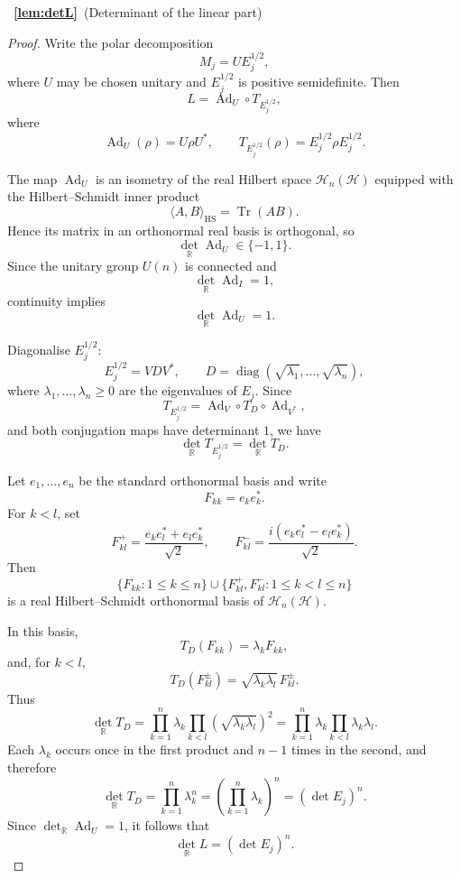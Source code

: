 \documentclass[11pt]{article}
\newcommand{\Tr}{\operatorname{Tr}}
\newcommand{\Herm}{\mathcal{H}_{n}}
\DeclareMathOperator{\diag}{diag}
\newcommand{\Ad}{\operatorname{Ad}}
\begin{document}
~{\bf \ref{lem:detL}}~(Determinant of the linear part)
\begin{proof}
Write the polar decomposition
\[
M_j=U E_j^{1/2},
\]
where \(U\) may be chosen unitary and \(E_j^{1/2}\) is positive
semidefinite. Then
\[
L=\Ad_U\circ T_{E_j^{1/2}},
\]
where
\[
\Ad_U(\rho)=U\rho U^*,
\qquad
T_{E_j^{1/2}}(\rho)
=
E_j^{1/2}\rho E_j^{1/2}.
\]

The map \(\Ad_U\) is an isometry of the real Hilbert space
\(\Herm(\mathcal H)\) equipped with the Hilbert--Schmidt inner product
\[
\langle A,B\rangle_{\mathrm{HS}}
=
\Tr(AB).
\]
Hence its matrix in an orthonormal real basis is orthogonal, so
\[
\det_{\mathbb R}\Ad_U\in\{-1,1\}.
\]
Since the unitary group \(U(n)\) is connected and
\[
\det_{\mathbb R}\Ad_I=1,
\]
continuity implies
\[
\det_{\mathbb R}\Ad_U=1.
\]

Diagonalise \(E_j^{1/2}\):
\[
E_j^{1/2}
=
V D V^*,
\qquad
D=\diag(\sqrt{\lambda_1},\ldots,\sqrt{\lambda_n}),
\]
where \(\lambda_1,\ldots,\lambda_n\geq0\) are the eigenvalues of
\(E_j\). Since
\[
T_{E_j^{1/2}}
=
\Ad_V\circ T_D\circ\Ad_{V^*},
\]
and both conjugation maps have determinant \(1\), we have
\[
\det_{\mathbb R}T_{E_j^{1/2}}
=
\det_{\mathbb R}T_D.
\]

Let \(e_1,\ldots,e_n\) be the standard orthonormal basis and write
\[
F_{kk}=e_ke_k^*.
\]
For \(k<l\), set
\[
F_{kl}^{+}
=
\frac{e_ke_l^*+e_le_k^*}{\sqrt2},
\qquad
F_{kl}^{-}
=
\frac{i(e_ke_l^*-e_le_k^*)}{\sqrt2}.
\]
Then
\[
\{F_{kk}:1\leq k\leq n\}
\cup
\{F_{kl}^{+},F_{kl}^{-}:1\leq k<l\leq n\}
\]
is a real Hilbert--Schmidt orthonormal basis of
\(\Herm(\mathcal H)\).

In this basis,
\[
T_D(F_{kk})=\lambda_kF_{kk},
\]
and, for \(k<l\),
\[
T_D(F_{kl}^{\pm})
=
\sqrt{\lambda_k\lambda_l}\,F_{kl}^{\pm}.
\]
Thus
\[
\det_{\mathbb R}T_D
=
\prod_{k=1}^n\lambda_k
\prod_{k<l}
\left(\sqrt{\lambda_k\lambda_l}\right)^2
=
\prod_{k=1}^n\lambda_k
\prod_{k<l}\lambda_k\lambda_l.
\]
Each \(\lambda_k\) occurs once in the first product and \(n-1\) times
in the second, and therefore
\[
\det_{\mathbb R}T_D
=
\prod_{k=1}^n\lambda_k^n
=
\left(\prod_{k=1}^n\lambda_k\right)^n
=
(\det E_j)^n.
\]
Since \(\det_{\mathbb R}\Ad_U=1\), it follows that
\[
\det_{\mathbb R}L
=
(\det E_j)^n.
\]
\end{proof}
\end{document}
